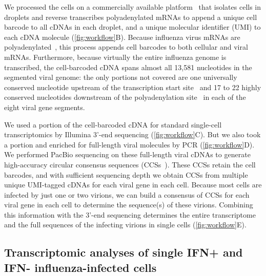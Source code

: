\documentclass[10pt,letterpaper]{article}
\newcommand{\FIG}[1]{\autoref{fig:#1}}
\begin{document}
We processed the cells on a commercially available platform~\cite{zheng2017massively} that isolates cells in droplets and reverse transcribes polyadenylated mRNAs to append a unique cell barcode to all cDNAs in each droplet, and a unique molecular identifier (UMI) to each cDNA molecule (\FIG{workflow}B).
Because influenza virus mRNAs are polyadenylated~\cite{robertson1981polyadenylation}, this process appends cell barcodes to both cellular and viral mRNAs.
Furthermore, because virtually the entire influenza genome is transcribed, the cell-barcoded cDNA spans almost all 13,581 nucleotides in the segmented viral genome: the only portions not covered are one universally conserved nucleotide upstream of the transcription start site~\cite{koppstein2015sequencing} and 17 to 22 highly conserved nucleotides downstream of the polyadenylation site~\cite{robertson1981polyadenylation} in each of the eight viral gene segments.

We used a portion of the cell-barcoded cDNA for standard single-cell transcriptomics by Illumina 3'-end sequencing (\FIG{workflow}C).
But we also took a portion and enriched for full-length viral molecules by PCR (\FIG{workflow}D).
We performed PacBio sequencing on these full-length viral cDNAs to generate high-accuracy circular consensus sequences (CCSs~\cite{travers2010flexible}).
These CCSs retain the cell barcodes, and with sufficient sequencing depth we obtain CCSs from multiple unique UMI-tagged cDNAs for each viral gene in each cell.
Because most cells are infected by just one or two virions, we can build a consensus of CCSs for each viral gene in each cell to determine the sequence(s) of these virions.
Combining this information with the 3'-end sequencing determines the entire transcriptome and the full sequences of the infecting virions in single cells (\FIG{workflow}E).

\subsection*{Transcriptomic analyses of single IFN+ and IFN- influenza-infected cells}
\end{document}
